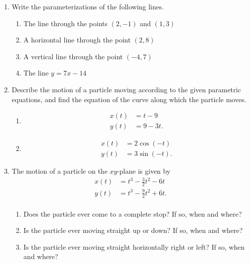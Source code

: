 \documentclass[11pt]{article}
\begin{document}
\drawtitle

\begin{enumerate}

\item Write the parameterizations of the following lines.
  \begin{enumerate}
  \item The line through the points $(2,-1)$ and $(1,3)$
    \vfill
  \item A horizontal line through the point $(2, 8)$
    \vfill
  \item A vertical line through the point $(-4, 7)$
    \vfill
  \item The line $y=7x-14$
    \vfill
  \end{enumerate}
  \newpage

\item Describe the motion of a particle moving according to the given
  parametric equations, and find the equation of the curve along which
  the particle moves.
  
  \begin{enumerate}
  \item 
    \begin{align*}
      x(t) &= t - 9\\
      y(t) &= 9 - 3t.
    \end{align*}
    \vfill
  \item
    \begin{align*}
      x(t) &= 2\cos(-t)\\
      y(t) &= 3\sin(-t).
    \end{align*}
    \vfill
  \end{enumerate}
  \newpage
  
\item The motion of a particle on the $xy$-plane is given by
  \begin{align*}
    x(t) &= t^3 - \frac{3}{2}t^2 - 6t\\
    y(t) &= t^3 - \frac{9}{2}t^2 + 6t.\\
  \end{align*}

  \begin{enumerate}
  \item Does the particle ever come to a complete stop?  If so, when
    and where?
    \vfill
  \item Is the particle ever moving straight up or down?  If so, when
    and where?
    \vfill
  \item Is the particle ever moving straight horizontally right or
    left?  If so, when and where?
    \vfill
  \end{enumerate}
  \newpage
  

\end{enumerate}
\end{document}
